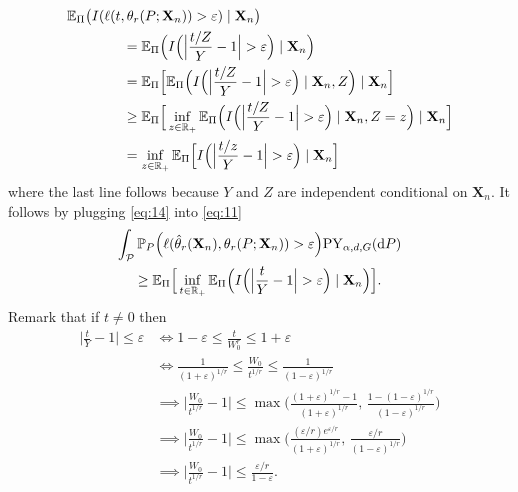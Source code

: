 \documentclass{article}
\newcommand{\1}{\boldsymbol{1}}
\newcommand{\EE}{\mathbb{E}}
\newcommand{\PP}{\mathbb{P}}
\theoremstyle{plain}
\begin{document}
\begin{align}
  \notag
  &\EE_{\Pi}\big(I( \ell(t,\theta_r(P;\mathbf{X}_n)) > \varepsilon ) \mid \mathbf{X}_n\big)\\
  \notag
  &\qquad\qquad= \EE_{\Pi}\Big(I\Big(  \Big|\frac{t/Z}{Y} - 1\Big| > \varepsilon \Big) \mid \mathbf{X}_n\Big)\\
  \notag
  &\qquad\qquad= \EE_{\Pi}\Big[ \EE_{\Pi}\Big(I\Big( \Big|\frac{t/Z}{Y} - 1\Big| > \varepsilon \Big) \mid \mathbf{X}_n, Z\Big) \mid \mathbf{X}_n \Big]\\
  \notag
  &\qquad\qquad\geq \EE_{\Pi}\Big[\inf_{z\in \NNReals} \EE_{\Pi}\Big(I\Big( \Big|\frac{t/Z}{Y} - 1\Big| > \varepsilon \Big) \mid \mathbf{X}_n, Z = z\Big) \mid \mathbf{X}_n\Big]\\
    \label{eq:14}
  &\qquad\qquad= \inf_{z\in \NNReals} \EE_{\Pi}\Big[I\Big( \Big|\frac{t/z}{Y} - 1\Big| > \varepsilon \Big) \mid \mathbf{X}_n\Big]
\end{align}
where the last line follows because $Y$ and $Z$ are independent conditional on $\mathbf{X}_n$. It follows by plugging \eqref{eq:14} into \eqref{eq:11}
\begin{multline*}
  \int_{\mathcal{P}}\PP_P\Big(\ell(\hat{\theta}_r(\mathbf{X}_n),\theta_r(P;\mathbf{X}_n)) > \varepsilon \Big) \mathrm{PY}_{\alpha,d,G}(\intd P)\\%
  \geq \EE_{\Pi}\Big[ \inf_{t\in \NNReals}\EE_{\Pi}\Big(I\Big( \Big| \frac{t}{Y} - 1\Big| > \varepsilon \Big) \mid \mathbf{X}_n\Big) \Big].
\end{multline*}
Remark that if $t \ne 0$ then
\begin{align*}
  \Big|\frac{t}{Y} - 1\Big| \leq \varepsilon%
  &\iff 1 - \varepsilon \leq \frac{t}{W_0^r} \leq 1 + \varepsilon\\
  &\iff \frac{1}{(1 + \varepsilon)^{1/r}} \leq \frac{W_0}{t^{1/r}} \leq \frac{1}{(1 - \varepsilon)^{1/r}}\\
  &\implies \Big| \frac{W_0}{t^{1/r}} - 1\Big| \leq%
    \max\Big(\frac{(1 + \varepsilon)^{1/r} - 1}{(1 + \varepsilon)^{1/r}} ,\, \frac{1 - (1 - \varepsilon)^{1/r}}{(1 - \varepsilon)^{1/r}}\Big)\\
  &\implies \Big| \frac{W_0}{t^{1/r}} - 1\Big| \leq%
    \max\Big(\frac{(\varepsilon/r)e^{\varepsilon/r}}{(1 + \varepsilon)^{1/r}} ,\, \frac{\varepsilon/r}{(1 - \varepsilon)^{1/r}}\Big)\\
  & \implies \Big| \frac{W_0}{t^{1/r}} - 1\Big| \leq%
    \frac{\varepsilon/r}{1 - \varepsilon}.
\end{align*}
\end{document}
